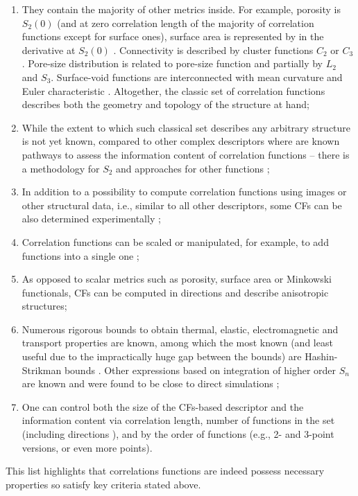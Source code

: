 \documentclass[reprint,amsmath,amssymb,aps,pre,showkeys,showpacs]{revtex4-1}
\begin{document}
\begin{enumerate}
  \item They contain the majority of other metrics inside. For example, porosity
    is $S_2(0)$ (and at zero correlation length of the majority of correlation
    functions except for surface ones), surface area is represented by in the
    derivative at $S_2(0)$ \cite{debye1957scattering}. Connectivity is described by cluster
    functions $C_2$ or $C_3$. Pore-size distribution is related to pore-size
    function and partially by $L_2$ and $S_3$. Surface-void functions are
    interconnected with mean curvature and Euler characteristic
    \cite{ma2020generation}. Altogether, the classic set of correlation
    functions describes both the geometry and topology of the structure at hand;
  \item While the extent to which such classical set describes any arbitrary
    structure is not yet known, compared to other complex descriptors where are
    known pathways to assess the information content of correlation functions --
    there is a methodology for $S_2$ \cite{Gommes2} and approaches for other
    functions \cite{Degeneraty.045306,CHERKASOV2024129400};
  \item In addition to a possibility to compute correlation functions using
    images or other structural data, i.e., similar to all other descriptors,
    some CFs can be also determined experimentally
    \cite{debye1957scattering,barrall1992nmr,dietrich1995scattering,li2018accurate};
  \item Correlation functions can be scaled \cite{karsaninaPRL} or manipulated,
    for example, to add functions into a single one \cite{moctezuma2002};
  \item As opposed to scalar metrics such as porosity, surface area or Minkowski
    functionals, CFs can be computed in directions and describe anisotropic
    structures;
  \item Numerous rigorous bounds to obtain thermal, elastic, electromagnetic and
    transport properties are known, among which the most known (and least useful
    due to the impractically huge gap between the bounds) are Hashin-Strikman
    bounds \cite{hashin1963variational}. Other expressions based on integration
    of higher order $S_n$ are known and were found to be close to direct
    simulations
    \cite{brown1955solid,beran1965use,milton1981bounds,hlushkou2015effective};
  \item One can control both the size of the CFs-based descriptor and the
    information content via correlation length, number of functions in the set
    (including directions \cite{EPL2}), and by the order of functions (e.g., 2-
    and 3-point versions, or even more points).
\end{enumerate}
This list highlights that correlations functions are indeed possess necessary
properties so satisfy key criteria stated above.
\end{document}

